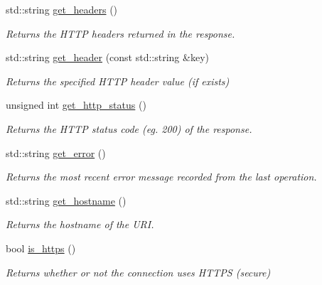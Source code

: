 \begin{DoxyCompactItemize}
std\+::string \hyperlink{class_vessel_1_1_networking_1_1_http_client_ad5ffe2d677a1ea783a66d3ea8d57d948}{get\+\_\+headers} ()
\begin{DoxyCompactList}\small\item\em Returns the H\+T\+TP headers returned in the response. \end{DoxyCompactList}\item 
std\+::string \hyperlink{class_vessel_1_1_networking_1_1_http_client_abc244e7785648a4bd016a69f374a7e0b}{get\+\_\+header} (const std\+::string \&key)
\begin{DoxyCompactList}\small\item\em Returns the specified H\+T\+TP header value (if exists) \end{DoxyCompactList}\item 
unsigned int \hyperlink{class_vessel_1_1_networking_1_1_http_client_a0bb9af88cb6fa0cda2d613165c9a7a24}{get\+\_\+http\+\_\+status} ()
\begin{DoxyCompactList}\small\item\em Returns the H\+T\+TP status code (eg. 200) of the response. \end{DoxyCompactList}\item 
std\+::string \hyperlink{class_vessel_1_1_networking_1_1_http_client_a3038fd22cae695a56ce50aba86cad642}{get\+\_\+error} ()
\begin{DoxyCompactList}\small\item\em Returns the most recent error message recorded from the last operation. \end{DoxyCompactList}\item 
std\+::string \hyperlink{class_vessel_1_1_networking_1_1_http_client_a71876628efd404463072ea3741c5cd03}{get\+\_\+hostname} ()
\begin{DoxyCompactList}\small\item\em Returns the hostname of the U\+RI. \end{DoxyCompactList}\item 
bool \hyperlink{class_vessel_1_1_networking_1_1_http_client_ac6f264effcb5e9dc5804b3582467eb98}{is\+\_\+https} ()
\begin{DoxyCompactList}\small\item\em Returns whether or not the connection uses H\+T\+T\+PS (secure) \end{DoxyCompactList}\item 
\mbox{\label{class_vessel_1_1_networking_1_1_http_client_a97220e27c1c9d24792d05462d64978ff}} 

\end{DoxyCompactItemize}
